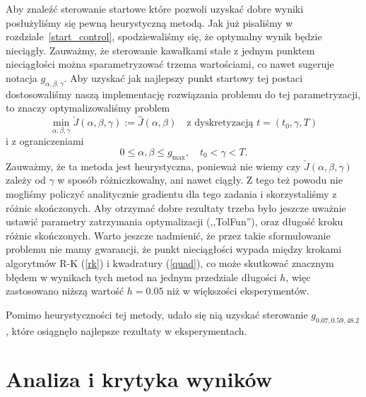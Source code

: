 \documentclass[licencjacka]{pracamgr}
\begin{document}
Aby znaleźć sterowanie startowe które pozwoli uzyskać dobre wyniki posłużyliśmy się pewną heurystyczną metodą. Jak już pisaliśmy w rozdziale~\ref{start_control}, spodziewaliśmy się, że optymalny wynik będzie nieciągły. Zauważmy, że sterowanie kawałkami stałe z jednym punktem nieciągłości można sparametryzować trzema wartościami, co nawet sugeruje notacja $g_{\alpha,\beta,\gamma}$. Aby uzyskać jak najlepszy punkt startowy tej postaci dostosowaliśmy naszą implementację rozwiązania problemu do tej parametryzacji, to znaczy optymalizowaliśmy problem
\begin{equation}
  \min_{\alpha,\beta,\gamma} \check{J}(\alpha,\beta,\gamma) := \hat{J}(\alpha, \beta)\quad \text{z dyskretyzacją } t = (t_0, \gamma, T)
\end{equation}
i z ograniczeniami
\begin{equation}
  0 \le \alpha,\beta \le g_{\max}, \quad t_0 < \gamma < T.
\end{equation}
Zauważmy, że ta metoda jest heurystyczna, ponieważ nie wiemy czy $\check{J}(\alpha,\beta,\gamma)$ zależy od $\gamma$ w sposób różniczkowalny, ani nawet ciągły. Z tego też powodu nie mogliśmy policzyć analitycznie gradientu dla tego zadania i skorzystaliśmy z różnic skończonych. Aby otrzymać dobre rezultaty trzeba było jeszcze uważnie ustawić parametry zatrzymania optymalizacji (,,TolFun''), oraz długość kroku różnic skończonych. Warto jeszcze nadmienić, że przez takie sformułowanie problemu nie mamy gwarancji, że punkt nieciągłości wypada między krokami algorytmów R-K (\ref{rk}) i kwadratury (\ref{quad}), co może skutkować znacznym błędem w wynikach tych metod na jednym przedziale długości $h$, więc zastosowano niższą wartość $h = 0.05$ niż w większości eksperymentów.

Pomimo heurystyczności tej metody, udało się nią uzyskać sterowanie $g_{0.07,0.59,48.2}$, które osiągnęło najlepsze rezultaty w eksperymentach.

\chapter{Analiza i krytyka wyników}
\end{document}
